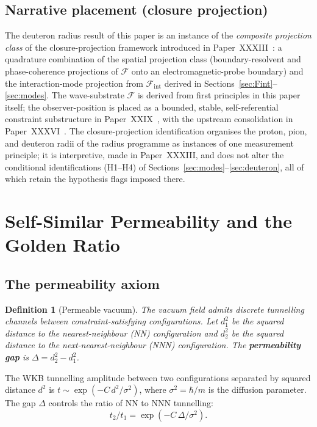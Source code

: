 \documentclass[12pt]{article}
\newtheorem{definition}[theorem]{Definition}
\newcommand{\Fcal}{\mathcal{F}}
\newcommand{\Fint}{\Fcal_{\mathrm{int}}}
\begin{document}
\subsection*{Narrative placement (closure projection)}

The deuteron radius result of this paper is an instance of the \textit{composite projection class} of the closure-projection framework introduced in Paper~XXXIII~\citep{SmartXXXIII}: a quadrature combination of the spatial projection class (boundary-resolvent and phase-coherence projections of $\Fcal$ onto an electromagnetic-probe boundary) and the interaction-mode projection from $\Fint$ derived in Sections~\ref{sec:Fint}--\ref{sec:modes}. The wave-substrate $\Fcal$ is derived from first principles in this paper itself; the observer-position is placed as a bounded, stable, self-referential constraint substructure in Paper~XXIX~\citep{SmartXXIX}, with the upstream consolidation in Paper~XXXVI~\citep{SmartXXXVI}. The closure-projection identification organises the proton, pion, and deuteron radii of the radius programme as instances of one measurement principle; it is interpretive, made in Paper~XXXIII, and does not alter the conditional identifications (H1--H4) of Sections~\ref{sec:modes}--\ref{sec:deuteron}, all of which retain the hypothesis flags imposed there.

\section{Self-Similar Permeability and the Golden Ratio}\label{sec:phi}

\subsection{The permeability axiom}

\begin{definition}[Permeable vacuum]\label{def:permeable}
The vacuum field admits discrete tunnelling channels between
constraint-satisfying configurations. Let $d_1^2$ be the squared
distance to the nearest-neighbour (NN) configuration and $d_2^2$ be the
squared distance to the next-nearest-neighbour (NNN) configuration. The
\textbf{permeability gap} is $\Delta = d_2^2 - d_1^2$.
\end{definition}

The WKB tunnelling amplitude between two configurations separated by
squared distance $d^2$ is $t \sim \exp(-C\,d^2/\sigma^2)$, where
$\sigma^2 = \hbar/m$ is the diffusion parameter. The gap $\Delta$
controls the ratio of NN to NNN tunnelling:
\begin{equation}\label{eq:tunnel_ratio}
    t_2/t_1 = \exp(-C\,\Delta/\sigma^2).
\end{equation}
\end{document}
